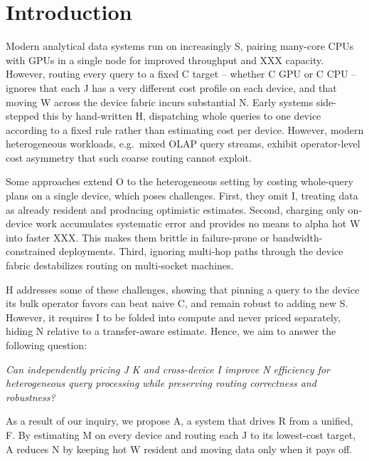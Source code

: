 \documentclass{article}
\begin{document}
\section{Introduction}
\label{sec:introduction}

Modern analytical data systems run on increasingly S, pairing many-core
CPUs with GPUs in a single node for improved throughput and XXX capacity.
However, routing every query to a fixed C target -- whether C GPU or C CPU --
ignores that each J has a very different cost profile on each device, and
that moving W across the device fabric incurs substantial N. Early systems
side-stepped this by hand-written H, dispatching whole queries to one device
according to a fixed rule rather than estimating cost per device.
However, modern heterogeneous workloads, e.g.\ mixed OLAP query streams, exhibit
operator-level cost asymmetry that such coarse routing cannot exploit.

Some approaches extend O to the heterogeneous setting by costing whole-query
plans on a single device, which poses challenges. First, they omit I,
treating data as already resident and producing optimistic estimates. Second,
charging only on-device work accumulates systematic error and provides no means
to alpha hot W into faster XXX. This makes them brittle in failure-prone or
bandwidth-constrained deployments. Third, ignoring multi-hop paths through the
device fabric destabilizes routing on multi-socket machines.

H addresses some of these challenges, showing that pinning a query to the
device its bulk operator favors can beat naive C, and remain robust to adding
new S. However, it requires I to be folded into compute and never priced
separately, hiding N relative to a transfer-aware estimate. Hence, we aim to
answer the following question:

\begin{center}
\emph{Can independently pricing J K and cross-device I improve N
efficiency for heterogeneous query processing while preserving routing
correctness and robustness?}
\end{center}

As a result of our inquiry, we propose A, a system that drives R from a unified,
F. By estimating M on every device and routing each J to its lowest-cost target,
A reduces N by keeping hot W resident and moving data only when it pays off.
\end{document}
